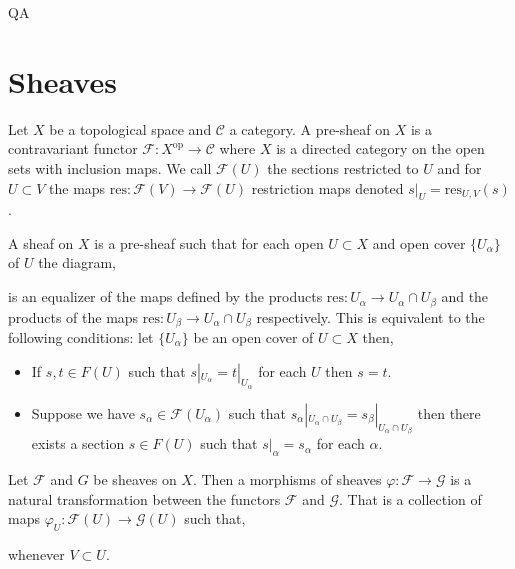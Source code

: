 QA	 \documentclass[12pt]{extarticle}
\theoremstyle{definition}
\newenvironment{definition}[1][Definition:]{\begin{trivlist}
\item[\hskip \labelsep {\bfseries #1}]}{\end{trivlist}}
\newcommand{\res}{\mathrm{res}}
\newcommand{\F}{\mathcal{F}}
\newcommand{\G}{\mathcal{G}}
\begin{document}
\section{Sheaves}

\begin{definition}
Let $X$ be a topological space and $\mathcal{C}$ a category. A pre-sheaf on $X$ is a contravariant functor $\F : X^{\mathrm{op}} \to \mathcal{C}$ where $X$ is a directed category on the open sets with inclusion maps. We call $\F(U)$ the sections restricted to $U$ and for $U \subset V$ the maps $\res : \F(V) \to \F(U)$ restriction maps denoted $s|_U = \res_{U, V}(s)$.    
\end{definition}

\begin{definition}
A sheaf on $X$ is a pre-sheaf such that for each open $U \subset X$ and open cover $\{ U_{\alpha} \}$ of $U$ the diagram,
\begin{center}
\end{center}
is an equalizer of the maps defined by the products $\res : U_{\alpha} \to U_{\alpha} \cap U_{\beta} $ and the products of the maps $\res : U_{\beta} \to U_{\alpha} \cap U_{\beta}$ respectively. This is equivalent to the following conditions: let $\{ U_{\alpha} \}$ be an open cover of $U \subset X$ then,
\begin{itemize}
\item If $s, t \in F(U)$ such that $s|_{U_{\alpha}} = t|_{U_{\alpha}}$ for each $U$ then $s = t$.

\item Suppose we have $s_{\alpha} \in \F(U_{\alpha})$ such that $s_{\alpha}|_{U_{\alpha} \cap U_{\beta}} = s_{\beta}|_{U_{\alpha} \cap U_{\beta}}$ then there exists a section $s \in F(U)$ such that $s|_{\alpha} = s_{\alpha}$ for each $\alpha$. 
\end{itemize} 
\end{definition}

\begin{definition}
Let $\F$ and $G$ be sheaves on $X$. Then a morphisms of sheaves $\varphi : \F \to \G$ is a natural transformation between the functors $\F$ and $\G$. That is a collection of maps $\varphi_U : \F(U) \to \G(U)$ such that,
\begin{center}
\end{center} 
whenever $V \subset U$. 
\end{definition}
\end{document}
